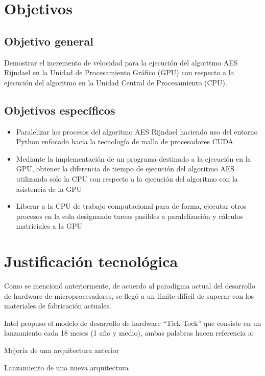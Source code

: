 \documentclass[../main/main.tex]{subfiles}
\begin{document}
  \section{Objetivos}

  \subsection{Objetivo general}

  Demostrar el incremento de velocidad para la ejecución del algoritmo AES Rijndael en la Unidad de Procesamiento Gráfico (GPU) con respecto a la ejecución del algoritmo en la Unidad Central de Procesamiento (CPU).

  \subsection{Objetivos específicos}

  \begin{itemize}
    \item Paralelizar los procesos del algoritmo AES Rijndael haciendo uso del entorno Python enfocado hacia la tecnología de malla de procesadores CUDA
    \item Mediante la implementación de un programa destinado a la ejecución en la GPU, obtener la diferencia de tiempo de ejecución del algoritmo AES utilizando solo la CPU con respecto a la ejecución del algoritmo con la asistencia de la GPU
    \item Liberar a la CPU de trabajo computacional para de forma, ejecutar otros procesos en la cola designando tareas pasibles a paralelización y cálculos matriciales a la GPU
  \end{itemize}

  \section{Justificación tecnológica}

  Como se mencionó anteriormente, de acuerdo al paradigma actual del desarrollo de hardware de microprocesadores, se llegó a un límite difícil de superar con los materiales de fabricación actuales.

  Intel propuso el modelo de desarrollo de hardware ``Tick-Tock'' que consiste en un lanzamiento cada 18 meses (1 año y medio), ambas palabras hacen referencia a:

  \begin{description}
    \item[Tick:] Mejoría de una arquitectura anterior
    \item[Tock:] Lanzamiento de una nueva arquitectura
  \end{description}
\end{document}
